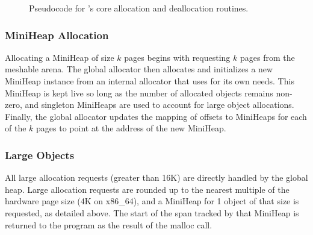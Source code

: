 \begin{figure}[!t]
  
%  
%  
%  
%  
%  
  \caption{Pseudocode for \Mesh's core allocation and deallocation routines.}
  \label{fig:malloc}
\end{figure}



\subsubsection{MiniHeap Allocation}

Allocating a MiniHeap of size $k$ pages begins with requesting $k$
pages from the meshable arena.  The global allocator then allocates
and initializes a new MiniHeap instance from an internal allocator
that \Mesh uses for its own needs. This MiniHeap is kept live so long
as the number of allocated objects remains non-zero, and singleton
MiniHeaps are used to account for large object allocations.  Finally,
the global allocator updates the mapping of offsets to MiniHeaps for
each of the $k$ pages to point at the address of the new MiniHeap.

\subsubsection{Large Objects}

All large allocation requests (greater than 16K) are directly
handled by the global heap. Large allocation requests are rounded up
to the nearest multiple of the hardware page size (4K on x86\_64),
and a MiniHeap for 1 object of that size is requested, as detailed
above.  The start of the span tracked by that MiniHeap is returned to
the program as the result of the malloc call.

